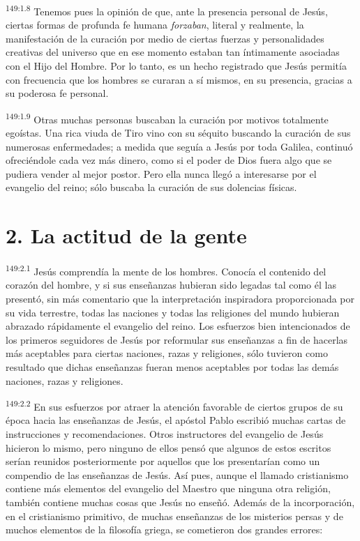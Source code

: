 \par
\textsuperscript{149:1.8} Tenemos pues la opinión de que, ante la presencia personal de Jesús, ciertas formas de profunda fe humana \textit{forzaban}, literal y realmente, la manifestación de la curación por medio de ciertas fuerzas y personalidades creativas del universo que en ese momento estaban tan íntimamente asociadas con el Hijo del Hombre. Por lo tanto, es un hecho registrado que Jesús permitía con frecuencia que los hombres se curaran a sí mismos, en su presencia, gracias a su poderosa fe personal.

\par
\textsuperscript{149:1.9} Otras muchas personas buscaban la curación por motivos totalmente egoístas. Una rica viuda de Tiro vino con su séquito buscando la curación de sus numerosas enfermedades; a medida que seguía a Jesús por toda Galilea, continuó ofreciéndole cada vez más dinero, como si el poder de Dios fuera algo que se pudiera vender al mejor postor. Pero ella nunca llegó a interesarse por el evangelio del reino; sólo buscaba la curación de sus dolencias físicas.

\section*{2. La actitud de la gente}
\par
\textsuperscript{149:2.1} Jesús comprendía la mente de los hombres. Conocía el contenido del corazón del hombre, y si sus enseñanzas hubieran sido legadas tal como él las presentó, sin más comentario que la interpretación inspiradora proporcionada por su vida terrestre, todas las naciones y todas las religiones del mundo hubieran abrazado rápidamente el evangelio del reino. Los esfuerzos bien intencionados de los primeros seguidores de Jesús por reformular sus enseñanzas a fin de hacerlas más aceptables para ciertas naciones, razas y religiones, sólo tuvieron como resultado que dichas enseñanzas fueran menos aceptables por todas las demás naciones, razas y religiones.

\par
\textsuperscript{149:2.2} En sus esfuerzos por atraer la atención favorable de ciertos grupos de su época hacia las enseñanzas de Jesús, el apóstol Pablo escribió muchas cartas de instrucciones y recomendaciones. Otros instructores del evangelio de Jesús hicieron lo mismo, pero ninguno de ellos pensó que algunos de estos escritos serían reunidos posteriormente por aquellos que los presentarían como un compendio de las enseñanzas de Jesús. Así pues, aunque el llamado cristianismo contiene más elementos del evangelio del Maestro que ninguna otra religión, también contiene muchas cosas que Jesús no enseñó. Además de la incorporación, en el cristianismo primitivo, de muchas enseñanzas de los misterios persas y de muchos elementos de la filosofía griega, se cometieron dos grandes errores:

